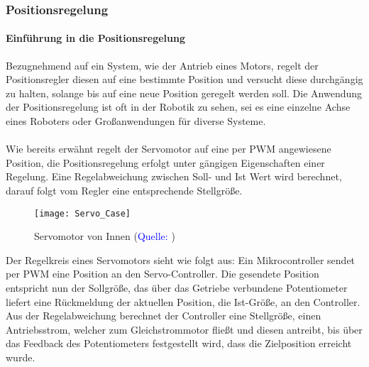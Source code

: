 \documentclass[titlepage,12pt,twoside]{article}
\begin{document}
\subsubsection{Positionsregelung}
\label{chap:Positionsregelung}
\paragraph{Einführung in die Positionsregelung}
\hfill \break
\hfill \break
Bezugnehmend auf ein System, wie der Antrieb eines Motors, regelt der 
Positionsregler diesen auf eine bestimmte Position und versucht diese 
durchgängig zu halten, solange bis auf eine neue Position geregelt 
werden soll. Die Anwendung der Positionsregelung ist oft in der Robotik 
zu sehen, sei es eine einzelne Achse eines Roboters oder Großanwendungen für diverse
Systeme. \\
\\
Wie bereits erwähnt regelt der Servomotor auf eine per PWM angewiesene Position, die 
Positionsregelung erfolgt unter gängigen Eigenschaften einer Regelung. Eine 
Regelabweichung zwischen Soll- und Ist Wert wird berechnet, darauf folgt vom Regler 
eine entsprechende Stellgröße. \\
\begin{figure}[H]
	\begin{center}
		\scalebox{0.8}
		{\texttt{[image: Servo\_Case]}}
		\caption{Servomotor von Innen (\textcolor{blue}{Quelle: \cite{Q13}})}
		\label{fig:Servo_Case}
	\end{center}
\end{figure}
\hfill \break
Der Regelkreis eines Servomotors sieht wie folgt aus: Ein Mikrocontroller sendet per 
PWM eine Position an den Servo-Controller. Die gesendete Position entspricht nun der 
Sollgröße, das über das Getriebe verbundene Potentiometer liefert eine Rückmeldung 
der aktuellen Position, die Ist-Größe, an den Controller. Aus der Regelabweichung 
berechnet der Controller eine Stellgröße, einen Antriebsstrom, welcher zum Gleichstrommotor 
fließt und diesen antreibt, bis über das Feedback des Potentiometers festgestellt 
wird, dass die Zielposition erreicht wurde. \\
\end{document}
